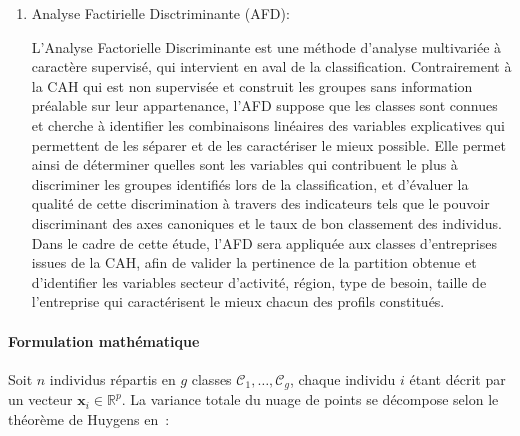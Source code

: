 \documentclass[12pt, a4paper, oneside]{report}
\begin{document}
\begin{enumerate}
	La méthode de Ward est retenue comme critère d'agrégation. Elle repose
	sur la minimisation de la perte d'inertie inter-classes lors de chaque
	fusion. Soient $C_a$ et $C_b$ deux classes de cardinalités respectives
	$n_a$ et $n_b$, de centres de gravité $\bar{x}_a$ et $\bar{x}_b$.
	L'écart de Ward entre $C_a$ et $C_b$ est défini par~:
	
	\begin{equation}
		\Delta(C_a, C_b) = \frac{n_a \cdot n_b}{n_a + n_b}
		\left\| \bar{x}_a - \bar{x}_b \right\|^2
		\label{eq:ward}
	\end{equation}
	
	À chaque étape de l'algorithme, les deux classes $C_a$ et $C_b$
	minimisant $\Delta(C_a, C_b)$ sont fusionnées en une classe
	$C_{ab} = C_a \cup C_b$.
	
	
	\item Analyse Factirielle Disctriminante (AFD):
	
	L'Analyse Factorielle Discriminante est une méthode d'analyse multivariée à caractère supervisé, qui intervient en aval de la classification. Contrairement à la CAH qui est non supervisée et construit les groupes sans information préalable sur leur appartenance, l'AFD suppose que les classes sont connues et cherche à identifier les combinaisons linéaires des variables explicatives qui permettent de les séparer et de les caractériser le mieux possible. Elle permet ainsi de déterminer quelles sont les variables qui contribuent le plus à discriminer les groupes identifiés lors de la classification, et d'évaluer la qualité de cette discrimination à travers des indicateurs tels que le pouvoir discriminant des axes canoniques et le taux de bon classement des individus. Dans le cadre de cette étude, l'AFD sera appliquée aux classes d'entreprises issues de la CAH, afin de valider la pertinence de la partition obtenue et d'identifier les variables secteur d'activité, région, type de besoin, taille de l'entreprise qui caractérisent le mieux chacun des profils constitués.
	\end{enumerate}
	
	\paragraph{Formulation mathématique}
	
	Soit $n$ individus répartis en $g$ classes $\mathcal{C}_1, \ldots, \mathcal{C}_g$, chaque individu $i$ étant décrit par un vecteur $\mathbf{x}_i \in \mathbb{R}^p$. La variance totale du nuage de points se décompose selon le théorème de Huygens en~:
	
\end{document}
